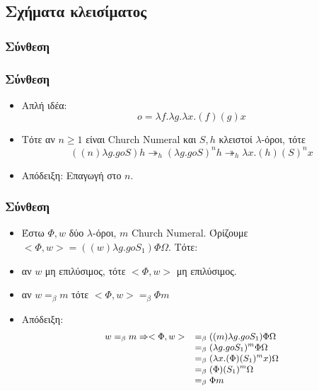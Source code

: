 \documentclass{beamer}
\begin{document}
\subsection{Σχήματα κλεισίματος}
\subsubsection{Σύνθεση}
\begin{frame}
        \frametitle{Σύνθεση}
        \begin{itemize}
                \item Απλή ιδέα: \[o = \lambda f. \lambda g. \lambda x . (f) (g) x\]
                \pause
                \item Τότε αν $n \geqslant 1$ είναι Church Numeral και $S, h$ κλειστοί $\lambda$-όροι, τότε
                \[ ((n) \lambda g . g o S) h \twoheadrightarrow _h (\lambda g . g o S)^n h
                   \twoheadrightarrow _h \lambda x . (h) (S)^n x \] \pause
                 \item Απόδειξη: Επαγωγή στο $n$.
        \end{itemize}
\end{frame}

\begin{frame}
        \frametitle{Σύνθεση}
        \begin{itemize}
                \item Έστω $\Phi, w$ δύο $\lambda$-όροι, $m$ Church Numeral. Όρίζουμε $<\Phi, w> = ((w) \lambda g . g o S_1) \Phi \Omega$. Τότε:
                \pause
                \item αν $w$ μη επιλύσιμος, τότε $<\Phi, w>$ μη επιλύσιμος. \pause
                \item αν $w =_\beta m$ τότε $<\Phi, w> =_\beta \Phi m$ \pause
                \item Απόδειξη: 
                \[
                \small
                \begin{array}{ll}
                w =_\beta m \Rightarrow <\Phi, w>
                & =_\beta ((m) \lambda g . g o S_1) \Phi \Omega \\
                & =_\beta (\lambda g . g o S_1)^m \Phi \Omega \\
                & =_\beta (\lambda x . (\Phi) (S_1)^m x) \Omega \\
                & =_\beta (\Phi) (S_1)^m \Omega \\
                & =_\beta \Phi m
                \end{array}
                \]           	
           
        \end{itemize}
\end{frame}
\end{document}
